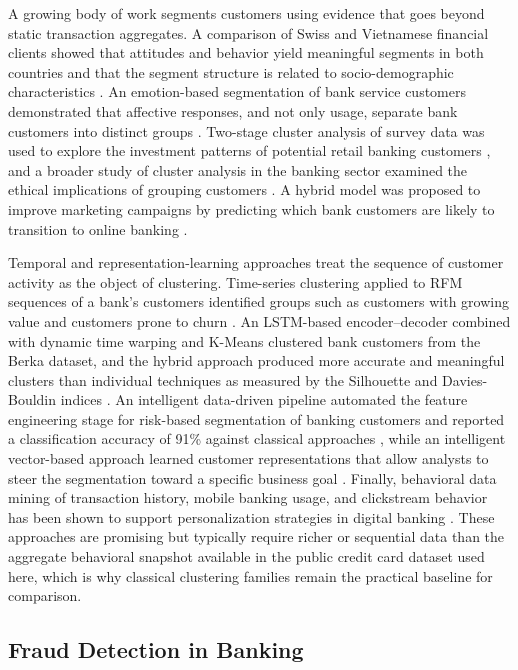 \documentclass[conference]{IEEEtran}
\begin{document}
A growing body of work segments customers using evidence that goes beyond static transaction aggregates. A comparison of Swiss and Vietnamese financial clients showed that attitudes and behavior yield meaningful segments in both countries and that the segment structure is related to socio-demographic characteristics \cite{swissvn2019}. An emotion-based segmentation of bank service customers demonstrated that affective responses, and not only usage, separate bank customers into distinct groups \cite{calvoporral2020}. Two-stage cluster analysis of survey data was used to explore the investment patterns of potential retail banking customers \cite{kovacs2021}, and a broader study of cluster analysis in the banking sector examined the ethical implications of grouping customers \cite{kumar2024}. A hybrid model was proposed to improve marketing campaigns by predicting which bank customers are likely to transition to online banking \cite{ganar2022}.

Temporal and representation-learning approaches treat the sequence of customer activity as the object of clustering. Time-series clustering applied to RFM sequences of a bank's customers identified groups such as customers with growing value and customers prone to churn \cite{abbasimehr2021}. An LSTM-based encoder--decoder combined with dynamic time warping and K-Means clustered bank customers from the Berka dataset, and the hybrid approach produced more accurate and meaningful clusters than individual techniques as measured by the Silhouette and Davies-Bouldin indices \cite{barkhordar2021}. An intelligent data-driven pipeline automated the feature engineering stage for risk-based segmentation of banking customers and reported a classification accuracy of 91\% against classical approaches \cite{zand2020}, while an intelligent vector-based approach learned customer representations that allow analysts to steer the segmentation toward a specific business goal \cite{mousaeirad2020}. Finally, behavioral data mining of transaction history, mobile banking usage, and clickstream behavior has been shown to support personalization strategies in digital banking \cite{graham2025}. These approaches are promising but typically require richer or sequential data than the aggregate behavioral snapshot available in the public credit card dataset used here, which is why classical clustering families remain the practical baseline for comparison.

\subsection{Fraud Detection in Banking}
\end{document}

